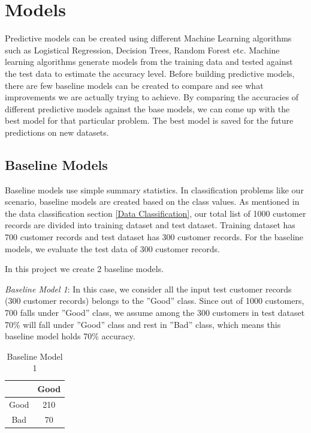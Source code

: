 \documentclass[sigconf]{acmart}
\begin{document}
\section{Models}

Predictive models can be created using different Machine Learning algorithms such as Logistical Regression, Decision Trees, Random Forest etc. Machine learning algorithms generate models from the training data and tested against the test data to estimate the accuracy level. Before building predictive models, there are few baseline models can be created to compare and see what improvements we are actually trying to achieve. By comparing the accuracies of different predictive models against the base models, we can come up with the best model for that particular problem. The best model is saved for the future predictions on new datasets.

\subsection{Baseline Models}

Baseline models use simple summary statistics. In classification problems like our scenario, baseline models are created based on the class values. As mentioned in the data classification section \ref{Data Classification}, our total list of 1000 customer records are divided into training dataset and test dataset. Training dataset has 700 customer records and test dataset has 300 customer records. For the baseline models, we evaluate the test data of 300 customer records.

In this project we create 2 baseline models. 

\textit{Baseline Model 1}: In this case, we consider all the input test customer records (300 customer records) belongs to the ''Good'' class. Since out of 1000 customers, 700 falls under ''Good'' class, we assume among the 300 customers in test dataset 70\% will fall under ''Good'' class and rest in ''Bad'' class, which means this baseline model holds 70\% accuracy. 

\begin{table}
  \caption{Baseline Model 1}
  \label{tab:table2}
  \begin{tabular}{cc}
    \toprule
     & Good\\
    \midrule
    Good& 210\\
    Bad& 70\\
    \bottomrule
  \end{tabular}
\end{table}
\end{document}
